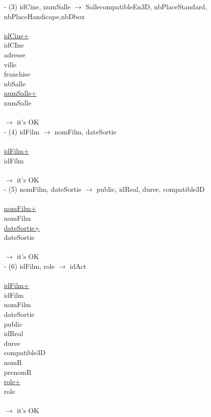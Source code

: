 \documentclass[a4paper,sffamily,12pt]{article}
\begin{document}
						\noindent - (3) idCine, numSalle $\rightarrow$ SallecompatibleEn3D, nbPlaceStandard, nbPlaceHandicape,nbDbox \\
							\\
							\underline{idCine+} \\
							idCIne\\
							adresse\\
							ville\\
							franchise\\
							nbSalle\\
							\underline{numSalle+} \\
							numSalle \\	
							\\									
						$\rightarrow$ it's OK \\													

						\noindent - (4) idFilm $\rightarrow$ nomFilm, dateSortie \\
							\\
							\underline{idFilm+} \\
							idFilm\\	
							\\									
						$\rightarrow$ it's OK \\	
						
						\noindent - (5) nomFilm, dateSortie $\rightarrow$ public, idReal, duree, compatible3D \\
							\\
							\underline{nomFilm+} \\
							nomFilm \\
							\underline{dateSortie+} \\
							dateSortie \\	
							\\									
						$\rightarrow$ it's OK \\	
						
						\noindent - (6) idFilm, role $\rightarrow$  idAct  \\
							\\
							\underline{idFilm+} \\
							idFilm \\
							nomFilm \\
							dateSortie \\
							public \\
							idReal \\
							duree \\
							compatible3D \\
							nomR \\
							prenomR \\
							\underline{role+} \\
							role \\	
							\\									
						$\rightarrow$ it's OK \\																				
			
\end{document}
